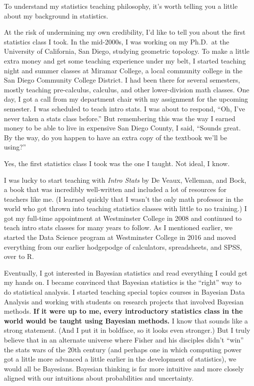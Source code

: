 \documentclass[
]{book}
\begin{document}
To understand my statistics teaching philosophy, it's worth telling you a little about my background in statistics.

At the risk of undermining my own credibility, I'd like to tell you about the first statistics class I took. In the mid-2000s, I was working on my Ph.D.~at the University of California, San Diego, studying geometric topology. To make a little extra money and get some teaching experience under my belt, I started teaching night and summer classes at Miramar College, a local community college in the San Diego Community College District. I had been there for several semesters, mostly teaching pre-calculus, calculus, and other lower-division math classes. One day, I got a call from my department chair with my assignment for the upcoming semester. I was scheduled to teach intro stats. I was about to respond, ``Oh, I've never taken a stats class before.'' But remembering this was the way I earned money to be able to live in expensive San Diego County, I said, ``Sounds great. By the way, do you happen to have an extra copy of the textbook we'll be using?''

Yes, the first statistics class I took was the one I taught. Not ideal, I know.

I was lucky to start teaching with \emph{Intro Stats} by De Veaux, Velleman, and Bock, a book that was incredibly well-written and included a lot of resources for teachers like me. (I learned quickly that I wasn't the only math professor in the world who got thrown into teaching statistics classes with little to no training.) I got my full-time appointment at Westminster College in 2008 and continued to teach intro stats classes for many years to follow. As I mentioned earlier, we started the Data Science program at Westminster College in 2016 and moved everything from our earlier hodgepodge of calculators, spreadsheets, and SPSS, over to R.

Eventually, I got interested in Bayesian statistics and read everything I could get my hands on. I became convinced that Bayesian statistics is the ``right'' way to do statistical analysis. I started teaching special topics courses in Bayesian Data Analysis and working with students on research projects that involved Bayesian methods. \textbf{If it were up to me, every introductory statistics class in the world would be taught using Bayesian methods.} I know that sounds like a strong statement. (And I put it in boldface, so it looks even stronger.) But I truly believe that in an alternate universe where Fisher and his disciples didn't ``win'' the stats wars of the 20th century (and perhaps one in which computing power got a little more advanced a little earlier in the development of statistics), we would all be Bayesians. Bayesian thinking is far more intuitive and more closely aligned with our intuitions about probabilities and uncertainty.
\end{document}
